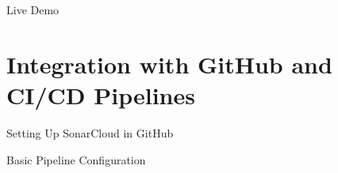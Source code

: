 \documentclass{beamer}
\begin{document}
\begin{frame}{Live Demo}
 
\end{frame}

\section[ Integration with GitHub and CI/CD Pipelines]{Integration with GitHub and CI/CD Pipelines}

\begin{frame}{Setting Up SonarCloud in GitHub}
 
\end{frame}

\begin{frame}{Basic Pipeline Configuration}
 
\end{frame}
\end{document}
